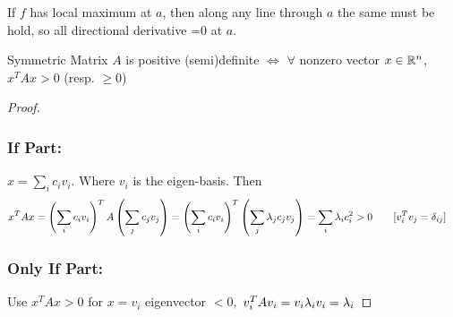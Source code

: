 If $f$ has local maximum  at $a$, then along any line through $a$ the same must be hold, so all directional derivative =0 at $a$.

\begin{Claim}{}{}
	Symmetric Matrix  $A$ is positive (semi)definite $\iff $ $\forall$ nonzero vector $x\in \mathbb{R}^n$, $x^TAx>0$ (resp. $\geq 0$)
\end{Claim}
\begin{proof}
	\subsubsection*{If Part:}
	$x=\sum\limits_{i}c_iv_i$. Where $v_i$ is the eigen-basis. Then \begin{align*}
		x^TAx & = \left(\sum\limits_{i}c_iv_i\right)^TA\left(\sum\limits_{j}c_jv_j\right) = \left(\sum\limits_{i}c_iv_i\right)^T\left( \sum_j\lambda_jc_jv_j \right) = \sum_i\lambda_ic_i^2>0 \qquad [v_i^Tv_j=\delta_{ij}]
	\end{align*}
\subsubsection*{Only If Part:}
Use $x^TAx>0$  for $x=v_i$ eigenvector $<0,$ $v_i^TAv_i=v_i\lambda_iv_i=\lambda_i$
\end{proof}



